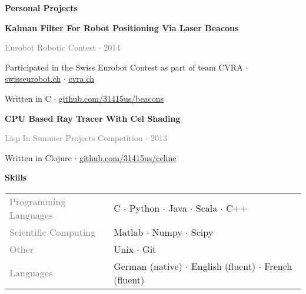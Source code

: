 \documentclass[10pt, a4paper]{article}
\begin{document}
\begin{trivlist}
\item \textcolor{Mahogany}{{\textbf{\Large Personal Projects}}}
    \noindent{}
    \begin{trivlist}
    \item
        \begin{trivlist}
        \item \textbf{Kalman Filter For Robot Positioning Via Laser Beacons}
        \item \textcolor{Gray}{Eurobot Robotic Contest $\cdot$ 2014}
        \item Participated in the Swiss Eurobot Contest as part
            of team CVRA $\cdot$ \href{http://www.swisseurobot.ch/}{swisseurobot.ch} $\cdot$ 
            \href{http://www.cvra.ch/}{cvra.ch}
        \item Written in C $\cdot$ \href{https://www.github.com/31415us/beacons}{github.com/31415us/beacons}
        \end{trivlist}
    \item
    \item
        \begin{trivlist}
        \item \textbf{CPU Based Ray Tracer With Cel Shading}
        \item \textcolor{Gray}{Lisp In Summer Projects Competition $\cdot$ 2013}
        \item Written in Clojure $\cdot$ \href{https://www.github.com/31415us/celine}{github.com/31415us/celine}
        \end{trivlist}
    \end{trivlist}
\item \textcolor{Mahogany}{{\textbf{\Large Skills}}}
    \noindent{}
    \begin{trivlist}
    \item
        \begin{tabular}{p{} p{}}
            \textcolor{Gray}{\small Programming Languages} & {\small C $\cdot$ Python $\cdot$ Java $\cdot$ Scala $\cdot$ C++} \\
            \textcolor{Gray}{\small Scientific Computing} & {\small Matlab $\cdot$ Numpy $\cdot$ Scipy} \\
            \textcolor{Gray}{\small Other} & {\small Unix $\cdot$ Git} \\
            \textcolor{Gray}{\small Languages} & {\small German (native) $\cdot$ English (fluent) $\cdot$ French (fluent)} \\
        \end{tabular}
    \end{trivlist}
\end{trivlist}
\end{document}
